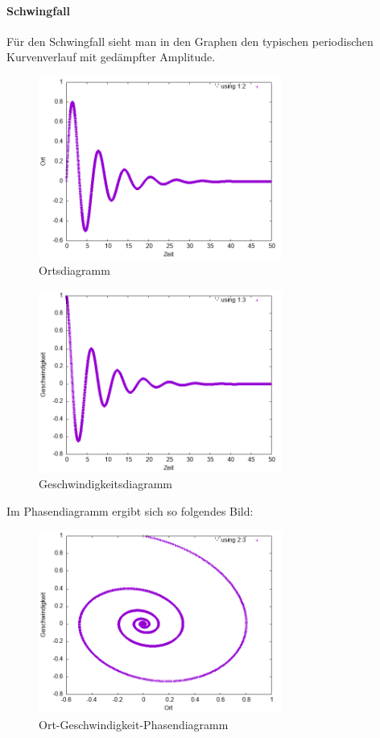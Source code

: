 \documentclass[
    oneside,
    ngerman,
    footinclude=false,
    captions=tableheading,
    DIV=12
]{scrartcl}
\begin{document}
        \subaufgabe{}
        \paragraph*{Schwingfall}
            Für den Schwingfall sieht man in den Graphen den typischen periodischen Kurvenverlauf mit gedämpfter Amplitude.   
                \begin{figure}[H]
                    \centering
                    \includegraphics[width=8cm]{Bilddateien/VVA1(b)-001-0.3-x.png}
                    \caption{Ortsdiagramm}
                \end{figure}
                \begin{figure}[H]
                    \centering
                    \includegraphics[width=8cm]{Bilddateien/VVA1(b)-001-0.3-V.png}
                    \caption{Geschwindigkeitsdiagramm}
                \end{figure}
            Im Phasendiagramm ergibt sich so folgendes Bild:
                \begin{figure}[H]
                    \centering
                    \includegraphics[width=8cm]{Bilddateien/VVA1(b)-001-0.3-xv.png}
                    \caption{Ort-Geschwindigkeit-Phasendiagramm}
                \end{figure}
\end{document}

